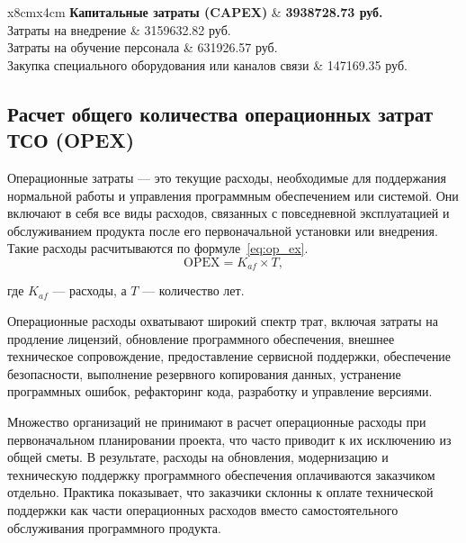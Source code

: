\begin{table}[H]
	\caption{Расчет капитальных затрат (CAPEX)}
	\centering
	
	\emergencystretch=10pt
	\begin{tabular}{x{8cm}x{4cm}}
		\toprule
		\textbf{Капитальные затраты  (CAPEX)} & \textbf{3938728.73 руб.} \\ \midrule
		Затраты на внедрение & 3159632.82 руб.\\
        Затраты на обучение персонала & 631926.57 руб.\\
        Закупка специального оборудования или каналов связи & 147169.35 руб.\\ \bottomrule
	\end{tabular}
	
	\label{tab:tco_capex}
\end{table}

\subsection{Расчет общего количества операционных затрат ТСО (OPEX)}


Операционные затраты --- это текущие расходы, необходимые для поддержания нормальной работы и управления программным обеспечением или системой. Они включают в себя все виды расходов, связанных с повседневной эксплуатацией и обслуживанием продукта после его первоначальной установки или внедрения. Такие расходы расчитываются по формуле~\ref{eq:op_ex}.
\begin{equation}
    \text{OPEX} = K_{af} \times T,
    \label{eq:op_ex}
\end{equation}

где $K_{af}$ --- расходы, а $T$ --- количество лет.

Операционные расходы охватывают широкий спектр трат, включая затраты на продление лицензий, обновление программного обеспечения, внешнее техническое сопровождение, предоставление сервисной поддержки, обеспечение безопасности, выполнение резервного копирования данных, устранение программных ошибок, рефакторинг кода, разработку и управление версиями.

Множество организаций не принимают в расчет операционные расходы при первоначальном планировании проекта, что часто приводит к их исключению из общей сметы. В результате, расходы на обновления, модернизацию и техническую поддержку программного обеспечения оплачиваются заказчиком отдельно. Практика показывает, что заказчики склонны к оплате технической поддержки как части операционных расходов вместо самостоятельного обслуживания программного продукта.

